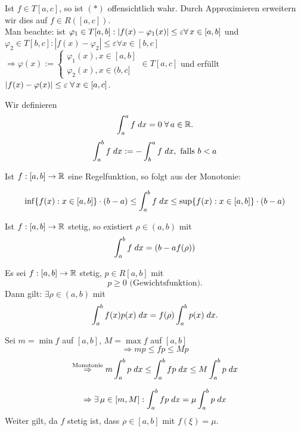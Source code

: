 \documentclass[../ana2.tex]{subfiles}
\begin{document}
\begin{bew}
    Ist \( f \in T[a,c] \), so ist \( (*) \) offensichtlich wahr.
    Durch Approximieren erweitern wir dies auf 
    \( f \in R([a,c]) \).\\
    Man beachte: ist \( \varphi_1 \in T[a,b]: \abs{f(x) - \varphi_1(x)} 
    \leq \varepsilon \forall x\in[a,b] \)
    und \( \varphi_2 \in T[b, c]: |f(x)-\varphi_2| \leq \varepsilon \forall x \in [b,c]\)    
    \( \Rightarrow \varphi(x) := \begin{cases}
        \varphi_1(x), x\in [a,b]\\
        \varphi_2(x), x \in (b,c]
    \end{cases} \in T[a,c] \) und erfüllt \( \abs{f(x) - \varphi(x)} \leq \varepsilon 
    \; \forall x \in [a,c] \).
\end{bew}
\begin{notation}
    Wir definieren
    \[ \integral{f}{a}{a} = 0 \;\forall a\in\R. \]
    \[ \integral{f}{a}{b} := - \integral{f}{b}{a}, \text{ falls } b < a \]
\end{notation}
\begin{bem}
    Ist \( \abb{f}{[a,b]}{\R} \) eine Regelfunktion,
    so folgt aus der Monotonie:
    
    \[ \inf \set{f(x): x\in[a,b]} \cdot (b-a) \leq \integral{f}{a}{b} 
    \leq \sup \set{f(x): x \in [a,b]} \cdot (b-a) \]
    
    Ist \( \abb{f}{[a,b]}{\R} \) stetig, so existiert 
    \( \rho \in (a,b) \) mit
    \[ \integral{f}{a}{b} = (b-af(\rho)) \]
\end{bem}
\begin{satz}
    Es sei \( \abb{f}{[a,b]}{\R} \) stetig, 
    \( p \in R[a,b] \) mit 
    \[ p \geq 0 \text{ (Gewichtsfunktion)}. \]
    Dann gilt: \( \exists \rho \in (a,b) \) mit 
    \[ \integral{f(x) p(x)}{a}{b} 
    = f(\rho) \integral{p(x)}{a}{b}. \]    
\end{satz}
\begin{bew}
    Sei \( m = \min f \) auf \([a,b]\), \(M=\max f\) auf \([a,b]\)
    \[ \Rightarrow m p \leq f p \leq M p \]
    \[ \oversett{Monotonie}{\Rightarrow} m \integral{p}{a}{b}
    \leq \integral{fp}{a}{b} \leq M \integral{p}{a}{b}  \]

    \[ \Rightarrow \exists \mu \in [m,M]: 
    \integral{fp}{a}{b} = \mu \integral{p}{a}{b} \]
    Weiter gilt, da \(f\) stetig ist, dass 
    \(\rho \in [a,b]\) mit \( f(\xi) = \mu \).
\end{bew}
\end{document}
